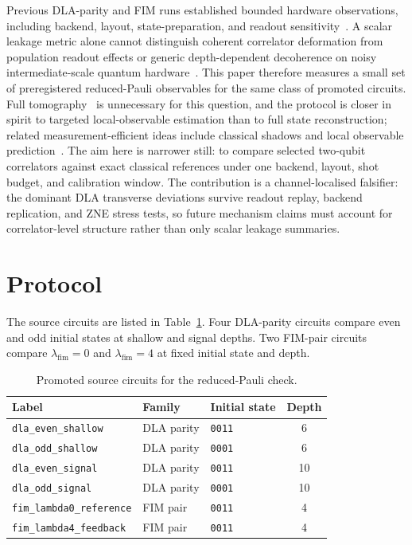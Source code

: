 \documentclass[preprint,aps,physrev,superscriptaddress,floatfix,longbibliography]{revtex4-2}
\begin{document}
Previous DLA-parity and FIM runs established bounded hardware observations,
including backend, layout, state-preparation, and readout
sensitivity~\cite{SotekDLA2026,SotekFIM2026}. A scalar
leakage metric alone cannot distinguish coherent correlator deformation from
population readout effects or generic depth-dependent decoherence on noisy
intermediate-scale quantum hardware~\cite{Preskill2018}. This paper therefore
measures a small set of preregistered reduced-Pauli observables for the same
class of promoted circuits. Full tomography~\cite{NielsenChuang2010} is
unnecessary for this question, and the protocol is closer in spirit to
targeted local-observable estimation than to full state reconstruction; related
measurement-efficient ideas include classical shadows and local observable
prediction~\cite{HuangKuengPreskill2020}. The aim here is narrower still: to
compare selected two-qubit correlators against exact classical references
under one backend, layout, shot budget, and calibration window.
The contribution is a channel-localised falsifier: the dominant DLA transverse
deviations survive readout replay, backend replication, and ZNE stress tests,
so future mechanism claims must account for correlator-level structure rather
than only scalar leakage summaries.

\section{Protocol}

The source circuits are listed in Table~\ref{tab:sources}. Four DLA-parity
circuits compare even and odd initial states at shallow and signal depths. Two
FIM-pair circuits compare $\lambda_{\mathrm{fim}}=0$ and
$\lambda_{\mathrm{fim}}=4$ at fixed initial state and depth.

\begin{table}[tb]
\centering
\begin{tabular}{lllc}
\toprule
Label & Family & Initial state & Depth \\
\midrule
\texttt{dla\_even\_shallow} & DLA parity & \texttt{0011} & 6 \\
\texttt{dla\_odd\_shallow} & DLA parity & \texttt{0001} & 6 \\
\texttt{dla\_even\_signal} & DLA parity & \texttt{0011} & 10 \\
\texttt{dla\_odd\_signal} & DLA parity & \texttt{0001} & 10 \\
\texttt{fim\_lambda0\_reference} & FIM pair & \texttt{0011} & 4 \\
\texttt{fim\_lambda4\_feedback} & FIM pair & \texttt{0011} & 4 \\
\bottomrule
\end{tabular}
\caption{Promoted source circuits for the reduced-Pauli check.}
\label{tab:sources}
\end{table}
\end{document}
